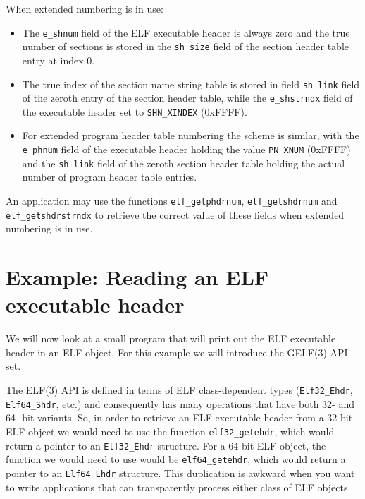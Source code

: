 \documentclass[a4paper,pdftex]{book}
\newcommand{\constant}[1]{\texttt{#1}}
\newcommand{\function}[1]{\texttt{#1}}
\newcommand{\parameter}[1]{\texttt{#1}}
\newcommand{\type}[1]{\texttt{#1}}
\begin{document}
When extended numbering is in use:

\begin{itemize}
\item The \parameter{e\_shnum} field of the ELF executable header is
  always zero and the true number of sections is stored in the
  \parameter{sh\_size} field of the section header table entry at
  index 0.
\item The  true index of the
  section name string table is stored in field \parameter{sh\_link}
  field of the zeroth entry of the section header table, while the
  \parameter{e\_shstrndx} field of the executable header set to
  \constant{SHN\_XINDEX} (0xFFFF).
\item {} For extended
  program header table numbering the scheme is similar, with the
  \parameter{e\_phnum} field of the executable header holding the
  value \constant{PN\_XNUM} (0xFFFF) and the \parameter{sh\_link}
  field of the zeroth section header table holding the actual number
  of program header table entries.
\end{itemize}

An  application may use
the functions \function{elf\_getphdrnum}, \function{elf\_getshdrnum}
and \function{elf\_getshdrstrndx} to retrieve the correct value of
these fields when extended numbering is in use.

\section{Example: Reading an ELF executable header}

We will now look at a small program that will print out the ELF
executable header in an ELF object. For this example we will introduce
the GELF(3) API set.%

The ELF(3) API is defined in terms of ELF class-dep\-endent types
(\type{Elf32\_\-Ehdr}, \type{Elf64\_\-Shdr}, etc.) and consequently
has many operations that have both 32- and 64- bit variants.  So, in
order to retrieve an ELF executable header from a 32 bit ELF object we
would need to use the function \function{elf32\_getehdr}, which would
return a pointer to an \type{Elf32\_Ehdr} structure.  For a 64-bit ELF
object, the function we would need to use would be
\function{elf64\_getehdr}, which would return a pointer to an
\type{Elf64\_Ehdr} structure.  This duplication is awkward when you
want to write applications that can transparently process either class
of ELF objects.%
\end{document}
